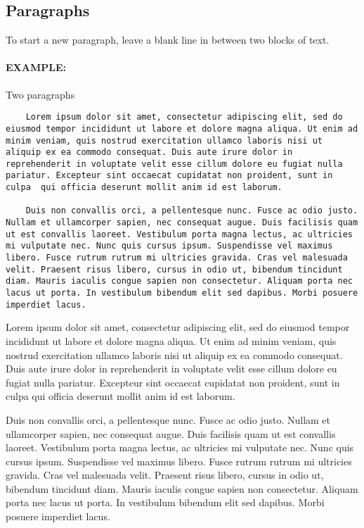 \documentclass[11pt]{article}
\begin{document}
\subsection*{Paragraphs}

To start a new paragraph, leave a blank line in between two blocks of text.

\paragraph{EXAMPLE:} Two paragraphs


\begin{lstlisting}
    Lorem ipsum dolor sit amet, consectetur adipiscing elit, sed do eiusmod tempor incididunt ut labore et dolore magna aliqua. Ut enim ad minim veniam, quis nostrud exercitation ullamco laboris nisi ut aliquip ex ea commodo consequat. Duis aute irure dolor in reprehenderit in voluptate velit esse cillum dolore eu fugiat nulla pariatur. Excepteur sint occaecat cupidatat non proident, sunt in culpa  qui officia deserunt mollit anim id est laborum.

    Duis non convallis orci, a pellentesque nunc. Fusce ac odio justo. Nullam et ullamcorper sapien, nec consequat augue. Duis facilisis quam ut est convallis laoreet. Vestibulum porta magna lectus, ac ultricies mi vulputate nec. Nunc quis cursus ipsum. Suspendisse vel maximus libero. Fusce rutrum rutrum mi ultricies gravida. Cras vel malesuada velit. Praesent risus libero, cursus in odio ut, bibendum tincidunt diam. Mauris iaculis congue sapien non consectetur. Aliquam porta nec lacus ut porta. In vestibulum bibendum elit sed dapibus. Morbi posuere imperdiet lacus.

\end{lstlisting}


    Lorem ipsum dolor sit amet, consectetur adipiscing elit, sed do eiusmod tempor incididunt ut labore et dolore magna aliqua. Ut enim ad minim veniam, quis nostrud exercitation ullamco laboris nisi ut aliquip ex ea commodo consequat. Duis aute irure dolor in reprehenderit in voluptate velit esse cillum dolore eu fugiat nulla pariatur. Excepteur sint occaecat cupidatat non proident, sunt in culpa  qui officia deserunt mollit anim id est laborum.

    Duis non convallis orci, a pellentesque nunc. Fusce ac odio justo. Nullam et ullamcorper sapien, nec consequat augue. Duis facilisis quam ut est convallis laoreet. Vestibulum porta magna lectus, ac ultricies mi vulputate nec. Nunc quis cursus ipsum. Suspendisse vel maximus libero. Fusce rutrum rutrum mi ultricies gravida. Cras vel malesuada velit. Praesent risus libero, cursus in odio ut, bibendum tincidunt diam. Mauris iaculis congue sapien non consectetur. Aliquam porta nec lacus ut porta. In vestibulum bibendum elit sed dapibus. Morbi posuere imperdiet lacus.
\end{document}
